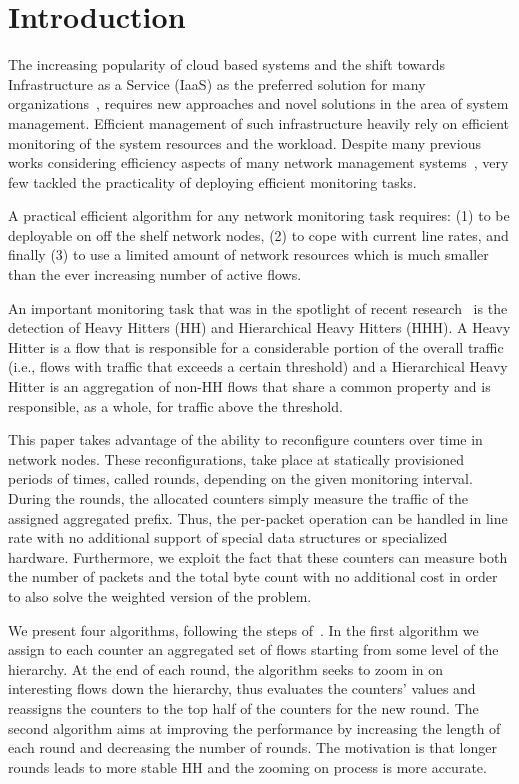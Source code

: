 \section{Introduction}
The increasing popularity of cloud based systems and the shift towards Infrastructure as a Service (IaaS)  as the preferred  solution for many organizations~\cite{Goyal2013}, requires new approaches and novel solutions in the area of system  management. Efficient management of such infrastructure heavily rely  on  efficient monitoring of the system resources and the workload. Despite many previous works considering efficiency aspects of many network management systems~\cite{devoflow, microte, anomaly}, very few tackled the practicality of deploying efficient monitoring tasks.

A practical efficient algorithm for any network monitoring task requires: (1) to be deployable on off the shelf network nodes, (2) to cope with current line rates, and finally (3) to use a limited amount of network resources which is much smaller than the ever increasing number of active flows.

An important monitoring task that was in the spotlight of recent research~\cite{ben2016heavy, basat2017optimal, ben2017constant, sivaraman2017heavy, HHHOnline, tong2015high} is the detection of Heavy Hitters (HH) and Hierarchical Heavy Hitters (HHH). A Heavy Hitter is a flow that is responsible for a considerable portion of the  overall traffic (i.e., flows with traffic that exceeds a certain threshold) and a Hierarchical Heavy Hitter is an aggregation of non-HH flows that share a common property and is responsible, as a whole, for traffic above the threshold.

This paper takes advantage of the ability to reconfigure counters over time in network nodes. These reconfigurations, take place at statically provisioned periods of times, called rounds, depending on the given monitoring interval.
During the rounds, the allocated counters simply measure the traffic of the assigned aggregated prefix. Thus, the per-packet operation can be handled in line rate with no additional support of special data structures or specialized hardware. Furthermore, we exploit the fact that these counters can measure both the number of packets and the total byte count with no additional cost in order to also solve the weighted version of the problem.

We present four algorithms, following the steps of~\cite{conf/sigcomm/YuanCM07,Moraney2016, Moraney2018}.  In the first algorithm we assign to each counter an aggregated set of flows starting from some level of the hierarchy. At the end of each round, the algorithm seeks to zoom in on interesting flows down the hierarchy,  thus evaluates the counters' values and reassigns the counters to the top half of the counters for the new round. The second algorithm aims at improving the performance by increasing the length of each round and decreasing the number of rounds. The motivation is that longer rounds leads to more stable HH and the zooming on process is more accurate.

